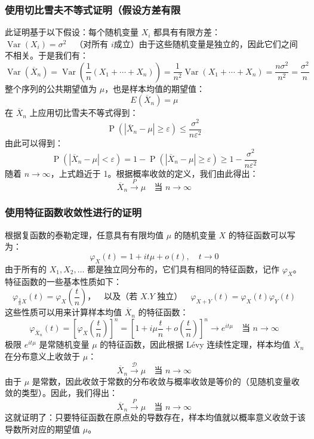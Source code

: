 \subsubsection{使用切比雪夫不等式证明（假设方差有限}
此证明基于以下假设：每个随机变量 $X_i$ 都具有有限方差：$\operatorname{Var}(X_i) = \sigma^2 \quad \text{（对所有 } i \text{成立）}$由于这些随机变量是独立的，因此它们之间不相关。于是我们有：
$$
\operatorname{Var}(\overline{X}_n) = \operatorname{Var}\left(\frac{1}{n}(X_1 + \cdots + X_n)\right) = \frac{1}{n^2} \operatorname{Var}(X_1 + \cdots + X_n) = \frac{n\sigma^2}{n^2} = \frac{\sigma^2}{n}~
$$
整个序列的公共期望值为 $\mu$，也是样本均值的期望值：
$$
E(\overline{X}_n) = \mu~
$$
在 $\overline{X}_n$ 上应用切比雪夫不等式得到：
$$
\operatorname{P}(|\overline{X}_n - \mu| \geq \varepsilon) \leq \frac{\sigma^2}{n\varepsilon^2}~
$$
由此可以得到：
$$
\operatorname{P}(|\overline{X}_n - \mu| < \varepsilon) = 1 - \operatorname{P}(|\overline{X}_n - \mu| \geq \varepsilon) \geq 1 - \frac{\sigma^2}{n\varepsilon^2}~
$$
随着 $n \to \infty$，上式趋近于 1。根据概率收敛的定义，我们由此得出：
$$
\overline{X}_n \overset{P}{\longrightarrow} \mu \quad \text{当 } n \to \infty~
$$
\subsubsection{使用特征函数收敛性进行的证明}
根据复函数的泰勒定理，任意具有有限均值 $\mu$ 的随机变量 $X$ 的特征函数可以写为：
$$
\varphi_X(t) = 1 + it\mu + o(t), \quad t \to 0~
$$
由于所有的 $X_1, X_2, \ldots$ 都是独立同分布的，它们具有相同的特征函数，记作 $\varphi_X$。
特征函数的一些基本性质如下：
$$
\varphi_{\frac{1}{n}X}(t) = \varphi_X\left(\frac{t}{n}\right)，\quad \text{以及（若 } X. Y \text{ 独立）} \quad \varphi_{X+Y}(t) = \varphi_X(t)\varphi_Y(t)~
$$
这些性质可以用来计算样本均值 $\overline{X}_n$ 的特征函数：
$$
\varphi_{\overline{X}_n}(t) = \left[\varphi_X\left(\frac{t}{n}\right)\right]^n = \left[1 + i\mu \frac{t}{n} + o\left(\frac{t}{n}\right)\right]^n \longrightarrow e^{it\mu} \quad \text{当 } n \to \infty ~
$$
极限 $e^{it\mu}$ 是常随机变量 $\mu$ 的特征函数，因此根据 Lévy 连续性定理，样本均值 $\overline{X}_n$ 在分布意义上收敛于 $\mu$：
$$
\overline{X}_n \xrightarrow{\mathcal{D}} \mu \quad \text{当 } n \to \infty~
$$
由于 $\mu$ 是常数，因此收敛于常数的分布收敛与概率收敛是等价的（见随机变量收敛的类型）。因此，我们得出：
$$
\overline{X}_n \xrightarrow{P} \mu \quad \text{当 } n \to \infty~
$$
这就证明了：只要特征函数在原点处的导数存在，样本均值就以概率意义收敛于该导数所对应的期望值 $\mu$。
